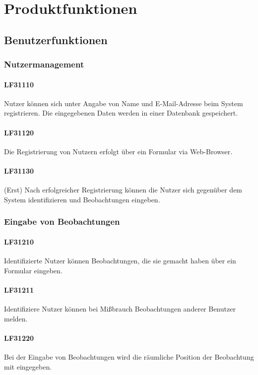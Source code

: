 \documentclass[a4paper,11pt]{scrartcl}
\begin{document}


\section{Produktfunktionen}
	\subsection{Benutzerfunktionen}
		\subsubsection{Nutzermanagement}
			\paragraph{LF31110}
				Nutzer können sich unter Angabe von Name und E-Mail-Adresse beim System registrieren.
				Die eingegebenen Daten werden in einer Datenbank gespeichert.
			\paragraph{LF31120}
				Die Registrierung von Nutzern erfolgt über ein Formular via Web-Browser.
			\paragraph{LF31130}
				(Erst) Nach erfolgreicher Registrierung können die Nutzer sich gegenüber dem System identifizieren und Beobachtungen eingeben.
		\subsubsection{Eingabe von Beobachtungen}
			\paragraph{LF31210}
				Identifizierte Nutzer können Beobachtungen, die sie gemacht haben über ein Formular eingeben.
			\paragraph{LF31211}
				Identifiziere Nutzer können bei Mißbrauch Beobachtungen anderer Benutzer melden.
			\paragraph{LF31220}
				Bei der Eingabe von Beobachtungen wird die räumliche Position der Beobachtung mit eingegeben.		
\end{document}
